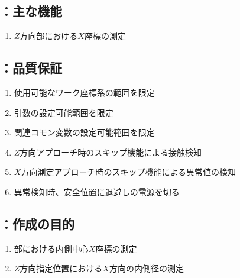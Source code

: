 \subsection{\MXOface：主な機能}
\begin{enumerate}[label*=\sarrow]
\item $Z$方向\KeywayCenter 部における\KeywayCenter$X$座標の測定
\end{enumerate}


\clearpage
\subsection{\MXOface：品質保証}
\begin{enumerate}[label*=\sarrow]
\item 使用可能なワーク座標系の範囲を限定
\item {}引数の設定可能範囲を限定
\item 関連コモン変数の設定可能範囲を限定
\item $Z$方向アプローチ時のスキップ機能による接触検知
\item $X$方向測定アプローチ時のスキップ機能による異常値の検知
\item 異常検知時、安全位置に退避し\TouchSensorProbe の電源を切る
\end{enumerate}



\clearpage


\subsection{\MXIWidth：作成の目的}
\begin{enumerate}[label*=\sarrow]
\item \EndFace 部における内側中心$X$座標の測定
\item $Z$方向指定位置における$X$方向の内側径の測定
\end{enumerate}


